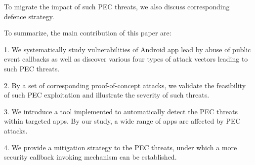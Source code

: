 To migrate the impact of such PEC threats, we also discuss corresponding defence strategy. 

To summarize, the main contribution of this paper are:

1. We systematically study vulnerabilities of Android app lead by abuse of public event callbacks as well as discover various {\color{red}four} types of attack vectors leading to such PEC threats. 
 
2. By a set of corresponding proof-of-concept attacks, we validate the feasibility of such PEC exploitation and illustrate the severity of such threats. 

3. We introduce a tool implemented to automatically detect the PEC threats within targeted apps. By our study, a wide range of apps are affected by PEC attacks.

4. We provide a mitigation strategy to the PEC threats, under which a more security callback invoking mechanism can be established.

